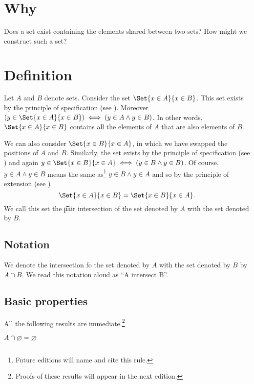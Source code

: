 
\section*{Why}

Does a set exist containing the elements shared between two sets?
How might we construct such a set?

\section*{Definition}

Let $A$ and $B$ denote sets.
Consider the set $\Set{x \in A}{x \in B}$.
This set exists by the principle of specification (see ).
Moreover $(y \in \Set{x \in A}{x \in B}) \iff (y \in A \land y \in B)$.
In other words, $\Set{x \in A}{x \in B}$ contains all the elements of $A$ that are also elements of $B$.

We can also consider $\Set{x \in B}{x \in A}$, in which we have swapped the positions of $A$ and $B$.
Similarly, the set exists by the principle of specification (see ) and again $y \in \Set{x \in B}{x \in A} \iff (y \in B \land y \in B)$.
Of course, $y \in A \land y \in B$ means the same as\footnote{Future editions will name and cite this rule.}
$y \in B \land y \in A$ and so by the principle of extension (see )
\[
\Set{x \in A}{x \in B} = \Set{x \in B}{x \in A}.
\]
We call this set the \t{pair intersection} of the set denoted by $A$ with the set denoted by $B$.

\subsection*{Notation}

We denote the intersection fo the set denoted by $A$ with the set denoted by $B$ by $A \cap  B$.
We read this notation aloud as ``A intersect B''.

\subsection*{Basic properties}

All the following results are immediate.\footnote{Proofs of these results will appear in the next edition.}

\begin{proposition}
$A \cap  \varnothing = \varnothing$
\end{proposition}

